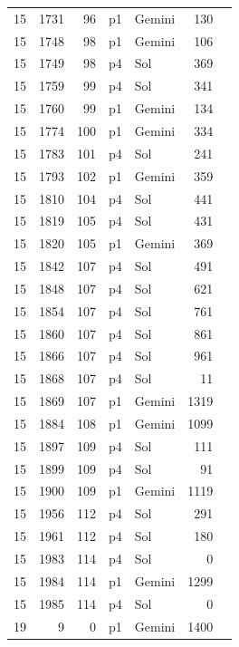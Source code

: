 \begin{longtable}{r r r l l r L{2.2in}}
15 & 1731 & 96 & p1 & Gemini & 130 &  \\
15 & 1748 & 98 & p1 & Gemini & 106 &  \\
15 & 1749 & 98 & p4 & Sol & 369 &  \\
15 & 1759 & 99 & p4 & Sol & 341 &  \\
15 & 1760 & 99 & p1 & Gemini & 134 &  \\
15 & 1774 & 100 & p1 & Gemini & 334 &  \\
15 & 1783 & 101 & p4 & Sol & 241 &  \\
15 & 1793 & 102 & p1 & Gemini & 359 &  \\
15 & 1810 & 104 & p4 & Sol & 441 &  \\
15 & 1819 & 105 & p4 & Sol & 431 &  \\
15 & 1820 & 105 & p1 & Gemini & 369 &  \\
15 & 1842 & 107 & p4 & Sol & 491 &  \\
15 & 1848 & 107 & p4 & Sol & 621 &  \\
15 & 1854 & 107 & p4 & Sol & 761 &  \\
15 & 1860 & 107 & p4 & Sol & 861 &  \\
15 & 1866 & 107 & p4 & Sol & 961 &  \\
15 & 1868 & 107 & p4 & Sol & 11 &  \\
15 & 1869 & 107 & p1 & Gemini & 1319 &  \\
15 & 1884 & 108 & p1 & Gemini & 1099 &  \\
15 & 1897 & 109 & p4 & Sol & 111 &  \\
15 & 1899 & 109 & p4 & Sol & 91 &  \\
15 & 1900 & 109 & p1 & Gemini & 1119 &  \\
15 & 1956 & 112 & p4 & Sol & 291 &  \\
15 & 1961 & 112 & p4 & Sol & 180 &  \\
15 & 1983 & 114 & p4 & Sol & 0 &  \\
15 & 1984 & 114 & p1 & Gemini & 1299 &  \\
15 & 1985 & 114 & p4 & Sol & 0 &  \\
19 & 9 & 0 & p1 & Gemini & 1400 &  \\

\end{longtable}
